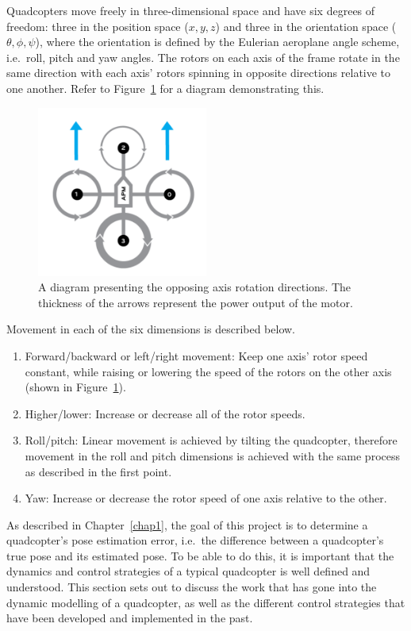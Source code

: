 Quadcopters move freely in three-dimensional space and have six degrees of freedom: three in the position space ($x, y, z$) and three in the orientation space ($\theta, \phi, \psi$), where the orientation is defined by the Eulerian aeroplane angle scheme, i.e.\ roll, pitch and yaw angles. The rotors on each axis of the frame rotate in the same direction with each axis' rotors spinning in opposite directions relative to one another. Refer to Figure~\ref{fig:chap2-quad-rotation} for a diagram demonstrating this. 
\begin{figure}
  \centering
  \includegraphics[width=0.5\textwidth]{figures/chapter2/quad_axis.pdf}
  \caption[Diagram presenting the opposing axis rotations directions.]{A diagram presenting the opposing axis rotation directions. The thickness of the arrows represent the power output of the motor.~\citep{quad-rotation-pic}}
\label{fig:chap2-quad-rotation}
\end{figure}
Movement in each of the six dimensions is described below. 

\begin{enumerate}
  \item Forward/backward or left/right movement: Keep one axis' rotor speed constant, while raising or lowering the speed of the rotors on the other axis (shown in Figure~\ref{fig:chap2-quad-rotation}).
  \item Higher/lower: Increase or decrease all of the rotor speeds.
  \item Roll/pitch: Linear movement is achieved by tilting the quadcopter, therefore movement in the roll and pitch dimensions is achieved with the same process as described in the first point. 
  \item Yaw: Increase or decrease the rotor speed of one axis relative to the other. 
\end{enumerate}

As described in Chapter~\ref{chap1}, the goal of this project is to determine a quadcopter's pose estimation error, i.e.\ the difference between a quadcopter's true pose and its estimated pose. To be able to do this, it is important that the dynamics and control strategies of a typical quadcopter is well defined and understood. This section sets out to discuss the work that has gone into the dynamic modelling of a quadcopter, as well as the different control strategies that have been developed and implemented in the past. 

